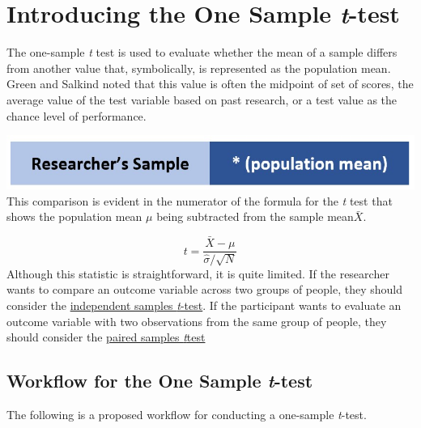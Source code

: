 \documentclass[
  11pt,
]{book}
\begin{document}
\hypertarget{introducing-the-one-sample-t-test}{%
\section{\texorpdfstring{Introducing the One Sample \emph{t}-test}{Introducing the One Sample t-test}}\label{introducing-the-one-sample-t-test}}

The one-sample \emph{t} test is used to evaluate whether the mean of a sample differs from another value that, symbolically, is represented as the population mean. Green and Salkind \citep{green_using_2014} noted that this value is often the midpoint of set of scores, the average value of the test variable based on past research, or a test value as the chance level of performance.

\includegraphics{images/ttests/onesample.jpg}
This comparison is evident in the numerator of the formula for the \emph{t} test that shows the population mean \(\mu\) being subtracted from the sample mean\(\bar{X}\).

\[
t = \frac{\bar{X} - \mu}{\hat{\sigma}/\sqrt{N} }
\]
Although this statistic is straightforward, it is quite limited. If the researcher wants to compare an outcome variable across two groups of people, they should consider the \protect\hyperlink{tIndSample}{independent samples \emph{t}-test}. If the participant wants to evaluate an outcome variable with two observations from the same group of people, they should consider the \protect\hyperlink{tPaired}{paired samples \emph{t}test}

\hypertarget{workflow-for-the-one-sample-t-test}{%
\subsection{\texorpdfstring{Workflow for the One Sample \emph{t}-test}{Workflow for the One Sample t-test}}\label{workflow-for-the-one-sample-t-test}}

The following is a proposed workflow for conducting a one-sample \emph{t}-test.
\end{document}
